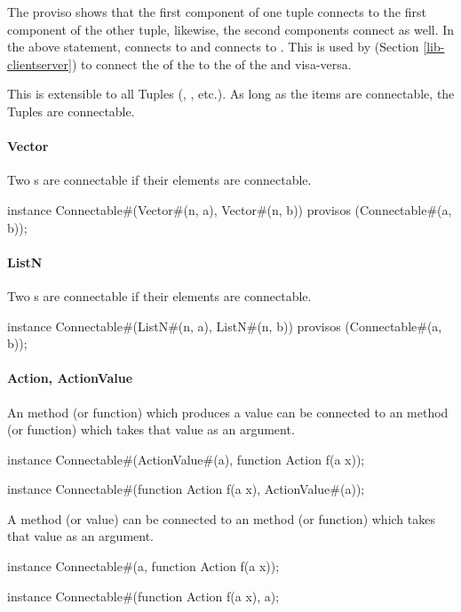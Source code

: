 The proviso shows that the first component of one tuple connects to
the first component of the other tuple, likewise, the second
components connect as well.  In the above statement,
 connects to  and  connects to .  This is used
by  (Section \ref{lib-clientserver}) to connect the
 of the  to the  of the  and
visa-versa.

This is extensible to all Tuples (, , etc.).  As
long as the items are connectable, the Tuples are connectable.


\paragraph{Vector}
Two s are connectable if their elements are connectable.
\begin{libverbatim}
instance Connectable#(Vector#(n, a), Vector#(n, b))
  provisos (Connectable#(a, b));
\end{libverbatim}


\paragraph{ListN}
Two s are connectable if their elements are connectable.
\begin{libverbatim}
instance Connectable#(ListN#(n, a), ListN#(n, b))
  provisos (Connectable#(a, b));
\end{libverbatim}


\paragraph{Action, ActionValue}
An  method
(or function) which produces a value can be connected  to an
 method (or function) which takes that value as an argument.

\begin{libverbatim}
instance Connectable#(ActionValue#(a), function Action f(a x));

instance Connectable#(function Action f(a x), ActionValue#(a));
\end{libverbatim}

A   method (or value) can be connected  to an 
method (or function) which takes that value as an argument.

\begin{libverbatim}
instance Connectable#(a, function Action f(a x));

instance Connectable#(function Action f(a x), a); 
\end{libverbatim}





